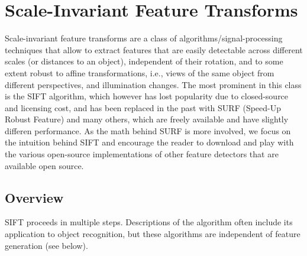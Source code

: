 \section{Scale-Invariant Feature Transforms}
Scale-invariant feature transforms are a class of algorithms/signal-processing techniques that allow to extract features that are easily detectable across different scales (or distances to an object), independent of their rotation, and to some extent robust to affine transformations, i.e., views of the same object from different perspectives, and illumination changes. The most prominent in this class is the SIFT algorithm, which however has lost popularity due to closed-source and licensing cost, and has been replaced in the past with SURF (Speed-Up Robust Feature) and many others,  which are freely available and have slightly differen performance. As the math behind SURF is more involved, we focus on the intuition behind SIFT and encourage the reader to download and play with the various open-source implementations of other feature detectors that are available open source.

\subsection{Overview}
SIFT proceeds in multiple steps. Descriptions of the algorithm often include its application to object recognition, but these algorithms are independent of feature generation (see below).

